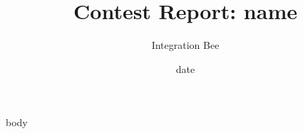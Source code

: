 \documentclass{article}
\begin{document}
\title{Contest Report: \textbf{ {{ name }} }}
\author{Integration Bee}
\date{ {{ date }} }
\maketitle
\tableofcontents

{{ body }}
\end{document}
